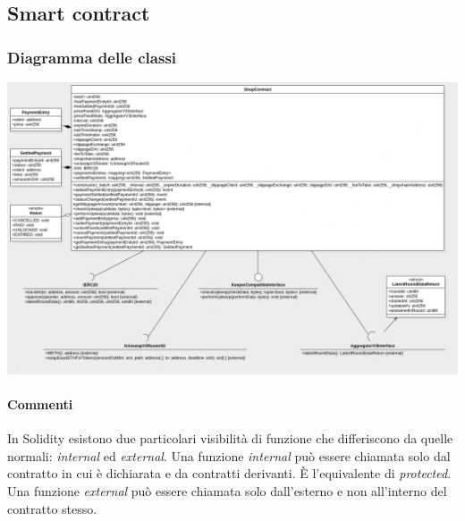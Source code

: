 \documentclass[a4paper, 12pt]{article}
\begin{document}
\newpage
\subsection{Smart contract}
\subsubsection{Diagramma delle classi}
\includegraphics[width=1.0\textwidth]{contract}
\paragraph{Commenti}
In Solidity esistono due particolari visibilità di funzione che differiscono da quelle normali: \textit{internal} ed \textit{external}.
Una funzione \textit{internal} può essere chiamata solo dal contratto in cui è dichiarata e da contratti derivanti.
È l'equivalente di \textit{protected}.
Una funzione \textit{external} può essere chiamata solo dall'esterno e non all'interno del contratto stesso.
\end{document}

